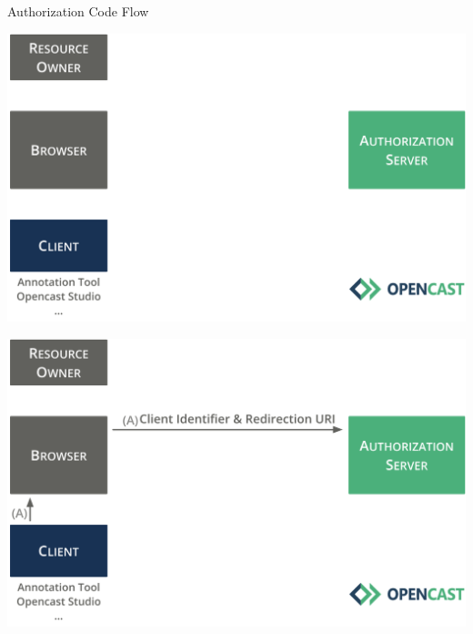 \documentclass[aspectratio=169]{beamer}
\begin{document}
\begin{frame}{Authorization Code Flow}
	\vspace*{0.5em}
	\begin{overprint}
		\centerline{\includegraphics[height=0.84\textheight]{figures/authorization-code-flow-01}}
		\centerline{\includegraphics[height=0.84\textheight]{figures/authorization-code-flow-02}}
	\end{overprint}
	\vspace{-2em}
\end{frame}
\end{document}
